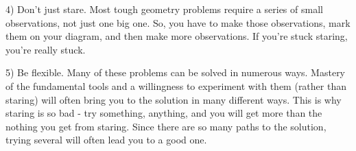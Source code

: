 4) Don't just stare. Most tough geometry problems require a series of small observations, not just one big one. So, you have to make those observations, mark them on your diagram, and then make more observations. If you're stuck staring, you're really stuck.

5) Be flexible. Many of these problems can be solved in numerous ways. Mastery of the fundamental tools and a willingness to experiment with them (rather than staring) will often bring you to the solution in many different ways. This is why staring is so bad - try something, anything, and you will get more than the nothing you get from staring. Since there are so many paths to the solution, trying several will often lead you to a good one.

